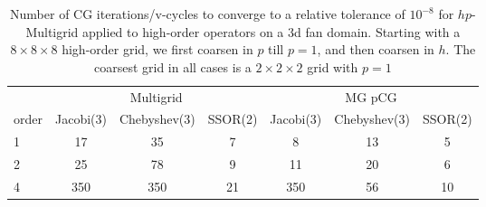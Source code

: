 \begin{table}
  \caption{\label{tab:hpmg} Number of CG iterations/v-cycles to converge to a relative tolerance of $10^{-8}$ for $hp$-Multigrid applied to high-order operators on a 3d fan domain. Starting with a $8\times 8\times 8$ high-order grid, we first coarsen in $p$ till $p=1$, and then coarsen in $h$. The coarsest grid in all cases is a $2\times 2\times 2$ grid with $p=1$}
		\centering
		\begin{tabular}{|l|c|c|c|c|c|c|} 
	    \hline
				    & \multicolumn{3}{c|}{Multigrid} & \multicolumn{3}{c|}{MG pCG}\\  \cline{2-7}
			order & \scriptsize Jacobi(3)  &\scriptsize  Chebyshev(3)  &\scriptsize SSOR(2) &\scriptsize Jacobi(3)  &\scriptsize  Chebyshev(3)  &\scriptsize SSOR(2) \\
			\hline
        1 & 17 & 35 & 7 & 8 & 13 & 5 \\
        2 & 25 & 78 & 9 & 11 & 20 & 6 \\
        4 & 350 & 350 & 21 & 350 & 56 & 10 \\
      \hline
	  \end{tabular}
\end{table}

